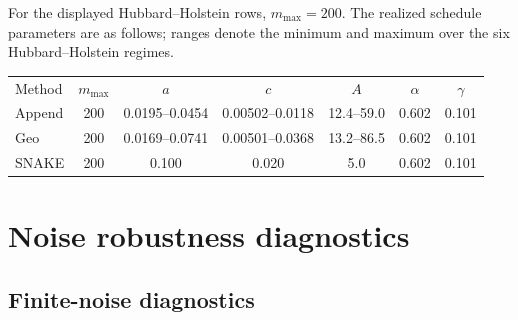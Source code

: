 \documentclass[
  reprint,
  amsmath,
  amssymb,
  aps,
  pra,
  nofootinbib,
  superscriptaddress,
  floatfix
]{revtex4-2}
\begin{document}
For the displayed Hubbard--Holstein rows, \(m_{\max}=200\). The realized
schedule parameters are as follows; ranges denote the minimum and maximum over
the six Hubbard--Holstein regimes.
\begin{center}
\scriptsize
\setlength{\tabcolsep}{1.4pt}
\renewcommand{\arraystretch}{1.05}
\begin{ruledtabular}
\begin{tabular}{lcccccc}
Method & \(m_{\max}\) & \(a\) & \(c\) & \(A\) & \(\alpha\) & \(\gamma\)\\
\colrule
Append & 200 & 0.0195--0.0454 & 0.00502--0.0118 & 12.4--59.0 & 0.602 & 0.101\\
Geo & 200 & 0.0169--0.0741 & 0.00501--0.0368 & 13.2--86.5 & 0.602 & 0.101\\
SNAKE & 200 & 0.100 & 0.020 & 5.0 & 0.602 & 0.101\\
\end{tabular}
\end{ruledtabular}
\end{center}

\section{Noise robustness diagnostics}
\label{app:noise_selection_robustness}
\label{app:finite_shot_score_robustness}

\subsection{Finite-noise diagnostics}
\end{document}
